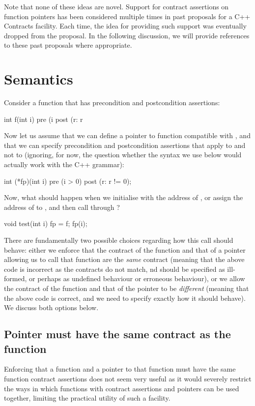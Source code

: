 Note that none of these ideas are novel. Support for contract assertions on function pointers has been considered multiple times in past proposals for a C++ Contracts facility. Each time, the idea for providing such support was eventually dropped from the proposal. In the following discussion, we will provide references to these past proposals where appropriate.

\section{Semantics}
Consider a function that has precondition and postcondition assertions:
\begin{codeblock}
int f(int i)
  pre (i %
  post (r: r %
\end{codeblock}
Now let us assume that we can define a pointer to function  compatible with , and that we can specify precondition and postcondition assertions that apply to  and not to  (ignoring, for now, the question whether the syntax we use below would actually work with the C++ grammar):
\begin{codeblock}
int (*fp)(int i) 
  pre (i > 0) 
  post (r: r != 0);
\end{codeblock}
Now, what should happen when we initialise  with the address of , or assign the address of  to , and then call  through ?
\begin{codeblock}  
void test(int i) {
  fp = f;    
  fp(i);
}
\end{codeblock}
There are fundamentally two possible choices regarding how this call should behave: either we enforce that the contract of the function and that of a pointer allowing us to call that function are the \emph{same} contract (meaning that the above code is incorrect as the contracts do not match, nd should be specified as ill-formed, or perhaps as undefined behaviour or erroneous behaviour), or we allow the contract of the function and that of the pointer to be \emph{different} (meaning that the above code is correct, and we need to specify exactly how it should behave). We discuss both options below.

\subsection{Pointer must have the same contract as the function}

Enforcing that a function and a pointer to that function must have the same function contract assertions does not seem very useful as it would severely restrict the ways in which functions with contract assertions and pointers can be used together, limiting the practical utility of such a facility.

